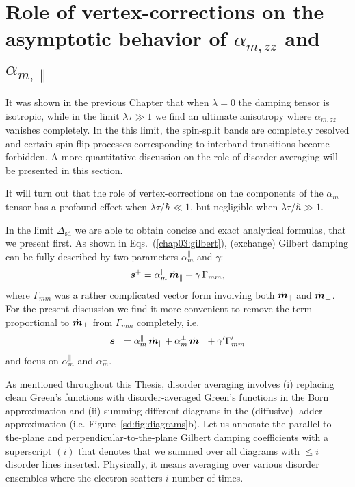 \section{Role of vertex-corrections on the asymptotic behavior of $\alpha_{m,zz}$ and $\alpha_{m,\parallel}$}
It was shown in the previous Chapter that when $\lambda=0$ the damping tensor is isotropic, while in the limit $\lambda\tau\gg 1$ we find an ultimate anisotropy where $\alpha_{m,zz}$ vanishes completely. In the this limit, the spin-split bands are completely resolved and certain spin-flip processes corresponding to interband transitions become forbidden. A more quantitative discussion on the role of disorder averaging will be presented in this section.

It will turn out that the role of vertex-corrections on the components of the $\alpha_m$ tensor has a profound effect when $\lambda\tau/\hbar\ll1$, but negligible when $\lambda\tau/\hbar\gg1$. 

In the limit $\Delta_\text{sd}$ we are able to obtain concise and exact analytical formulas, that we present first. As shown in Eqs.~(\ref{chap03:gilbert}), (exchange) Gilbert damping can be fully described by two parameters $\alpha_m^{\parallel}$ and $\gamma$: 
\begin{equation}
\boldsymbol{s}^+ = \alpha_m^{\parallel}\, \dot{\boldsymbol{m}}_{\parallel} + \gamma\, \Gamma_{mm},
\end{equation}where $\Gamma_{mm}$ was a rather complicated vector form involving both $\dot{\boldsymbol{m}}_{\parallel}$ and $\dot{\boldsymbol{m}}_\perp$. For the present discussion we find it more convenient to remove the term proportional to $\dot{\boldsymbol{m}}_{\perp}$ from $\Gamma_{mm}$ completely, i.e.
\begin{equation}
\boldsymbol{s}^+  = \alpha_m^{\parallel}\,\dot{\boldsymbol{m}}_\parallel + \alpha_m^{\perp}\,\dot{\boldsymbol{m}}_{\perp} + \gamma'\Gamma'_{mm} 
\end{equation}and focus on $\alpha_m^{\parallel}$ and $\alpha_m^{\perp}$. 

As mentioned throughout this Thesis, disorder averaging involves (i) replacing clean Green's functions with disorder-averaged Green's functions in the Born approximation and (ii) summing different diagrams in the (diffusive) ladder approximation (i.e. Figure~\ref{sd:fig:diagrams}b). Let us annotate the parallel-to-the-plane and perpendicular-to-the-plane Gilbert damping coefficients with a superscript $(i)$ that denotes that we summed over all diagrams with $\leq i$ disorder lines inserted. Physically, it means averaging over various disorder ensembles where the electron scatters $i$ number of times. 

